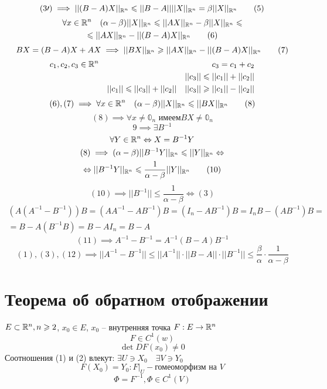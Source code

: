 \documentclass[main]{subfiles}
\begin{document}
    \begin{longProof}
      \[  (3\prime) \implies ||(B-A)X||_{\mathbb{R}^n} \leqslant ||B-A|| ||X||_{\mathbb{R}^n} = \beta||X||_{\mathbb{R}^n} \tag{5} \]
      \begin{multline*}
         \forall x \in \mathbb{R}^n \quad (\alpha-\beta) ||X||_{\mathbb{R}^n} \leqslant  ||AX||_{\mathbb{R}^n} - \beta||X||_{\mathbb{R}^n} \leqslant \\
         \leqslant ||AX||_{\mathbb{R}^n} - ||(B-A)X||_{\mathbb{R}^n} \tag{6} 
      \end{multline*}
      \[ BX = (B-A)X + AX \implies ||BX||_{\mathbb{R}^n} \geqslant ||AX||_{\mathbb{R}^n} - ||(B-A)X||_{\mathbb{R}^n} \tag{7} \]
      \begin{align*}
         c_1, c_2, c_3 \in \mathbb{R}^n && c_3 = c_1 + c_2 \\
        && ||c_3|| \leqslant ||c_1|| + ||c_2|| \\
         && ||c_1|| \leqslant ||c_3|| + ||c_2|| \quad ||c_3|| \geqslant ||c_1|| - ||c_2||
      \end{align*}
      \[(6), (7) \implies \forall x \in \mathbb{R}^n \quad (\alpha - \beta)||X||_{\mathbb{R}^n} \leqslant ||BX||_{\mathbb{R}^n} \tag{8} \] 
      \[ (8) \implies \forall x \ne \mathbb{0}_n \text{ имеем} BX \ne \mathbb{0}_n \tag{9} \]
      \[ 9 \implies \exists B^{-1} \]
      \[ \forall Y \in \mathbb{R}^n \Leftrightarrow X = B^{-1}Y \]
      \begin{multline*}
         (8) \implies (\alpha - \beta)||B^{-1}Y||_{\mathbb{R}^n} \leqslant ||Y||_{\mathbb{R}^n} \Leftrightarrow \\
         \Leftrightarrow ||B^{-1}Y||_{\mathbb{R}^n} \leqslant \frac{1}{\alpha - \beta} ||Y||_{\mathbb{R}^n} \tag{10} 
      \end{multline*}
      \[ (10) \implies ||B^{-1}|| \leq \frac{1}{\alpha-\beta} \Leftrightarrow (3) \]
      \begin{multline}
         (A(A^{-1}-B^{-1}))B = (AA^{-1} - AB^{-1})B = (I_n - AB^{-1})B = I_nB - (AB^{-1})B = \\
         =B - A(B^{-1}B) = B - AI_n = B - A \tag{11}
      \end{multline}
      \[ (11) \implies A^{-1} - B^{-1} = A^{-1}(B-A)B^{-1} \tag{12} \]
      \[ (1), (3), (12) \implies ||A^{-1} - B^{-1}||  \leq ||A^{-1}|| \cdot ||B-A|| \cdot ||B^{-1}|| \leq
      \frac{\beta}{\alpha} \cdot \frac{1}{\alpha-\beta} \tag{4} \]
    \end{longProof}


\section{Теорема об обратном отображении}
    $E \subset {\mathbb{R}}^n, n \geqslant 2$, $x_0 \in E$, $x_0 $ -- внутренняя точка
    $F: E \rightarrow {\mathbb{R}}^n$
    \[F \in C^{1}(w) \tag{1}\]
    \[ \det DF(x_0) \ne 0 \tag{2}\]
    Соотношения (1) и (2) влекут: $\exists U \ni X_0 \quad \exists V \ni Y_0$
        \[F(X_0) = Y_0:F|_U - \text{гомеоморфизм на } V  \tag{3} \]
        \[ \Phi = F^{-1}, \Phi \in C^1(V) \tag{4}\]
 
\end{document}

